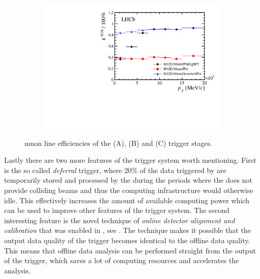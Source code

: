 \begin{figure}[t]
\begin{subfigure}{0.5\textwidth}
    \caption{}
    \label{det_run_one_hlt1_muon_line_eff}
  \end{subfigure}%
  \hfill%
  \begin{subfigure}{0.5\textwidth}
    \raggedright
    \includegraphics[width=\textwidth,trim=0.45cm 0cm 0.4cm 0cm, clip=true]{Figures/Chapter2/hlt2_muon_eff}
    \caption{}
    \label{det_run_one_hlt2_muon_line_eff}
  \end{subfigure}
  \caption{\runone muon line efficiencies of the \lzero (A), \hltone (B) and \hlttwo (C) trigger stages.}
  \label{det_run_one_muon_line_eff}
\end{figure}

Lastly there are two more features of the \lhcb trigger system worth mentioning. First is the so called
{\it deferral} trigger, where $20\%$ of the data triggered by \lzero are temporarily stored and processed by the \hlt
during the periods where the \lhc does not provide colliding beams and thus the \lhcb computing infrastructure
would otherwise idle. This effectively increases the amount of available computing power which can be used
to improve other features of the trigger system. The second interesting feature is the novel technique of
{\it online detector alignment and calibration} that was enabled in \runtwo, see \cite{Aaij:2016rxn}.
The technique makes it possible that the output data quality of the trigger becomes identical to the offline data quality.
This means that offline data analysis can be performed straight from the output of the trigger, which saves
a lot of computing resources and accelerates the analysis.
